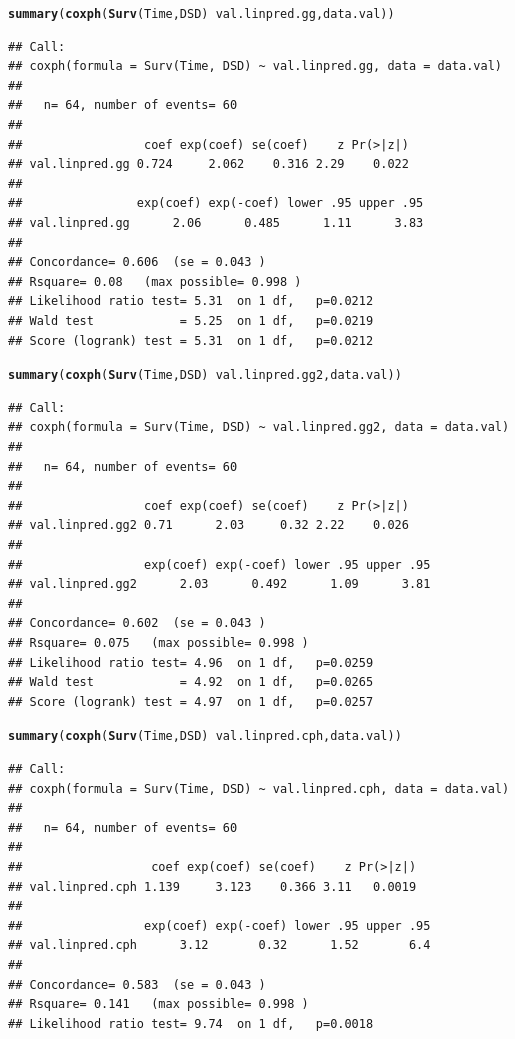 \documentclass{article}\usepackage[]{graphicx}\usepackage[]{color}
\makeatletter
\newcommand{\hlopt}[1]{\textcolor[rgb]{0,0,0}{#1}}%
\newcommand{\hlstd}[1]{\textcolor[rgb]{0.345,0.345,0.345}{#1}}%
\newcommand{\hlkwd}[1]{\textcolor[rgb]{0.737,0.353,0.396}{\textbf{#1}}}%
\newenvironment{kframe}{%
 \def\at@end@of@kframe{}%
 \ifinner\ifhmode%
  \def\at@end@of@kframe{\end{minipage}}%
  \begin{minipage}{\columnwidth}%
 \fi\fi%
 \def\FrameCommand##1{\hskip\@totalleftmargin \hskip-\fboxsep
 \colorbox{shadecolor}{##1}\hskip-\fboxsep
     \hskip-\linewidth \hskip-\@totalleftmargin \hskip\columnwidth}%
 \MakeFramed {\advance\hsize-\width
   \@totalleftmargin\z@ \linewidth\hsize
   \@setminipage}}%
 {\par\unskip\endMakeFramed%
 \at@end@of@kframe}
\newenvironment{knitrout}{}{} %
\makeatother
\begin{document}
\begin{knitrout}
\begin{kframe}
\begin{alltt}
\hlkwd{summary}\hlstd{(}\hlkwd{coxph}\hlstd{(}\hlkwd{Surv}\hlstd{(Time, DSD)} \hlopt{~} \hlstd{val.linpred.gg, data.val))}
\end{alltt}
\begin{verbatim}
## Call:
## coxph(formula = Surv(Time, DSD) ~ val.linpred.gg, data = data.val)
## 
##   n= 64, number of events= 60 
## 
##                 coef exp(coef) se(coef)    z Pr(>|z|)
## val.linpred.gg 0.724     2.062    0.316 2.29    0.022
## 
##                exp(coef) exp(-coef) lower .95 upper .95
## val.linpred.gg      2.06      0.485      1.11      3.83
## 
## Concordance= 0.606  (se = 0.043 )
## Rsquare= 0.08   (max possible= 0.998 )
## Likelihood ratio test= 5.31  on 1 df,   p=0.0212
## Wald test            = 5.25  on 1 df,   p=0.0219
## Score (logrank) test = 5.31  on 1 df,   p=0.0212
\end{verbatim}
\begin{alltt}
\hlkwd{summary}\hlstd{(}\hlkwd{coxph}\hlstd{(}\hlkwd{Surv}\hlstd{(Time, DSD)} \hlopt{~} \hlstd{val.linpred.gg2, data.val))}
\end{alltt}
\begin{verbatim}
## Call:
## coxph(formula = Surv(Time, DSD) ~ val.linpred.gg2, data = data.val)
## 
##   n= 64, number of events= 60 
## 
##                 coef exp(coef) se(coef)    z Pr(>|z|)
## val.linpred.gg2 0.71      2.03     0.32 2.22    0.026
## 
##                 exp(coef) exp(-coef) lower .95 upper .95
## val.linpred.gg2      2.03      0.492      1.09      3.81
## 
## Concordance= 0.602  (se = 0.043 )
## Rsquare= 0.075   (max possible= 0.998 )
## Likelihood ratio test= 4.96  on 1 df,   p=0.0259
## Wald test            = 4.92  on 1 df,   p=0.0265
## Score (logrank) test = 4.97  on 1 df,   p=0.0257
\end{verbatim}
\begin{alltt}
\hlkwd{summary}\hlstd{(}\hlkwd{coxph}\hlstd{(}\hlkwd{Surv}\hlstd{(Time, DSD)} \hlopt{~} \hlstd{val.linpred.cph, data.val))}
\end{alltt}
\begin{verbatim}
## Call:
## coxph(formula = Surv(Time, DSD) ~ val.linpred.cph, data = data.val)
## 
##   n= 64, number of events= 60 
## 
##                  coef exp(coef) se(coef)    z Pr(>|z|)
## val.linpred.cph 1.139     3.123    0.366 3.11   0.0019
## 
##                 exp(coef) exp(-coef) lower .95 upper .95
## val.linpred.cph      3.12       0.32      1.52       6.4
## 
## Concordance= 0.583  (se = 0.043 )
## Rsquare= 0.141   (max possible= 0.998 )
## Likelihood ratio test= 9.74  on 1 df,   p=0.0018

\end{verbatim}
\end{kframe}
\end{knitrout}
\end{document}
